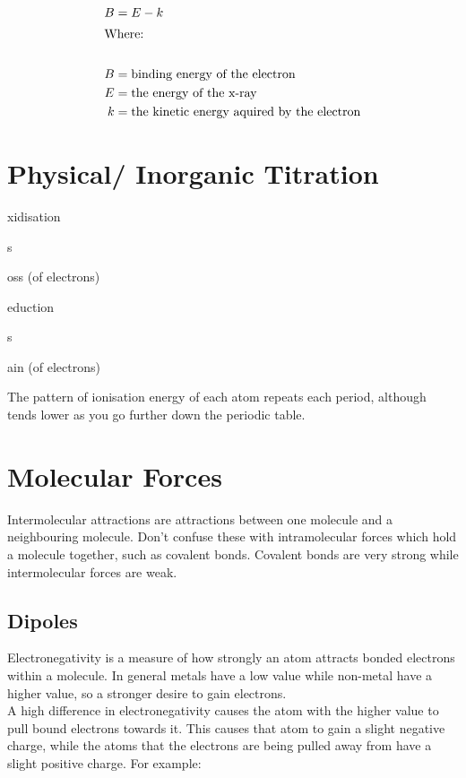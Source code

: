 \documentclass[a4paper, 12pt]{article}
\begin{document}
			\begin{align*}
				B &= E - k \\
				\intertext{Where:} \\
				B &= \text{binding energy of the electron} \\
				E &= \text{the energy of the x-ray} \\
				k &= \text{the kinetic energy aquired by the electron}
			\end{align*}

			
\newpage

\section{Physical/ Inorganic Titration}

	\begin{description}
		\item[O]xidisation
		\item[I]s
		\item[L]oss (of electrons)
		\item
		\item[R]eduction
		\item[I]s
		\item[G]ain (of electrons)
	\end{description}

	The pattern of ionisation energy of each atom repeats each period, although tends lower as you go further down the periodic table.

\newpage

\section{Molecular Forces}
	Intermolecular attractions are attractions between one molecule and a neighbouring molecule. Don't confuse these with intramolecular forces which hold a molecule together, such as covalent bonds. Covalent bonds are very strong while intermolecular forces are weak.
	
	\subsection{Dipoles}
		Electronegativity is a measure of how strongly an atom attracts bonded electrons within a molecule. In general metals have a low value while non-metal have a higher value, so a stronger desire to gain electrons. \\
		A high difference in electronegativity causes the atom with the higher value to pull bound electrons towards it. This causes that atom to gain a slight negative charge, while the atoms that the electrons are being pulled away from have a slight positive charge. For example: \\
		\\
\end{document}
